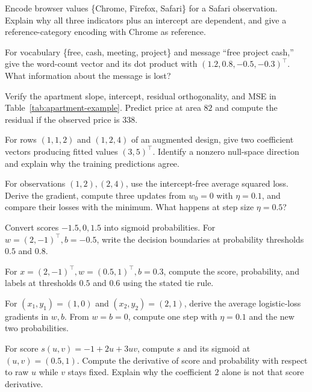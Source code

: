 \clearpage
\begingroup
{}
\begin{exercises}
\item {}Encode browser values \{Chrome, Firefox, Safari\} for a Safari observation. Explain why all three indicators plus an intercept are dependent, and give a reference-category encoding with Chrome as reference.
\item {}For vocabulary \{free, cash, meeting, project\} and message ``free project cash,'' give the word-count vector and its dot product with $(1.2,0.8,-0.5,-0.3)^\top$. What information about the message is lost?
\item {}Verify the apartment slope, intercept, residual orthogonality, and MSE in Table~\ref{tab:apartment-example}. Predict price at area $82$ and compute the residual if the observed price is $338$.
\item {}For rows $(1,1,2)$ and $(1,2,4)$ of an augmented design, give two coefficient vectors producing fitted values $(3,5)^\top$. Identify a nonzero null-space direction and explain why the training predictions agree.
\item {}For observations $(1,2),(2,4)$, use the intercept-free average squared loss. Derive the gradient, compute three updates from $w_0=0$ with $\eta=0.1$, and compare their losses with the minimum. What happens at step size $\eta=0.5$?
\item {}Convert scores $-1.5,0,1.5$ into sigmoid probabilities. For $w=(2,-1)^\top,b=-0.5$, write the decision boundaries at probability thresholds $0.5$ and $0.8$.
\item {}For $x=(2,-1)^\top,w=(0.5,1)^\top,b=0.3$, compute the score, probability, and labels at thresholds $0.5$ and $0.6$ using the stated tie rule.
\item {}For $(x_1,y_1)=(1,0)$ and $(x_2,y_2)=(2,1)$, derive the average logistic-loss gradients in $w,b$. From $w=b=0$, compute one step with $\eta=0.1$ and the new two probabilities.
\item {}For score $s(u,v)=-1+2u+3uv$, compute $s$ and its sigmoid at $(u,v)=(0.5,1)$. Compute the derivative of score and probability with respect to raw $u$ while $v$ stays fixed. Explain why the coefficient $2$ alone is not that score derivative.

\end{exercises}

